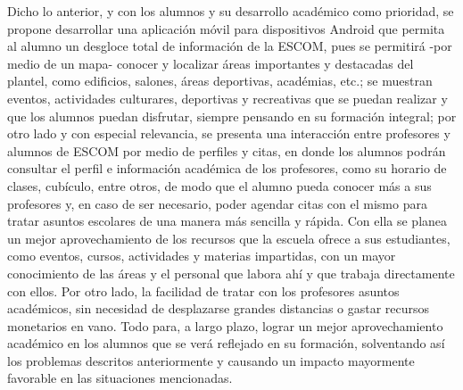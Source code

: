 Dicho lo anterior, y con los alumnos y su desarrollo académico como prioridad, se propone desarrollar una aplicación móvil para dispositivos Android que permita al alumno un desgloce total de información de la ESCOM, pues se permitirá -por medio de un mapa- conocer y localizar áreas importantes y destacadas del plantel, como edificios, salones, áreas deportivas, académias, etc.; se muestran eventos, actividades culturares, deportivas y recreativas que se puedan realizar y que los alumnos puedan disfrutar, siempre pensando en su formación integral; por otro lado y con especial relevancia, se presenta una interacción entre profesores y alumnos de ESCOM por medio de perfiles y citas, en donde los alumnos podrán consultar el perfil e información académica de los profesores, como su horario de clases, cubículo, entre otros, de modo que el alumno pueda conocer más a sus profesores y, en caso de ser necesario, poder agendar citas con el mismo para tratar asuntos escolares de una manera más sencilla y rápida. 
Con ella se planea un mejor aprovechamiento de los recursos que la escuela ofrece a sus estudiantes, como eventos, cursos, actividades y materias impartidas, con un mayor conocimiento de las áreas y el personal que labora ahí y que trabaja directamente con ellos. Por otro lado, la facilidad de tratar con los profesores asuntos académicos, sin necesidad de desplazarse grandes distancias o gastar recursos monetarios en vano. Todo para, a largo plazo, lograr un mejor aprovechamiento académico en los alumnos que se verá reflejado en su formación, solventando así los problemas descritos anteriormente y causando un impacto mayormente favorable en las situaciones mencionadas. 



